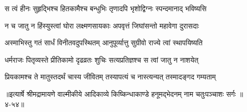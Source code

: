 \twolineshloka
{स त्वं हीनः सुहृद्भिश्च हितकामैश्च बन्धुभिः}
{तृणादपि भृशोद्विग्नः स्पन्दमानाद् भविष्यसि} %

\twolineshloka
{न च जातु न हिंस्युस्त्वां घोरा लक्ष्मणसायकाः}
{अपवृत्तं जिघांसन्तो महावेगा दुरासदाः} %

\twolineshloka
{अस्माभिस्तु गतं सार्धं विनीतवदुपस्थितम्}
{आनुपूर्व्यात्तु सुग्रीवो राज्ये त्वां स्थापयिष्यति} %

\twolineshloka
{धर्मराजः पितृव्यस्ते प्रीतिकामो दृढव्रतः}
{शुचिः सत्यप्रतिज्ञश्च स त्वां जातु न नाशयेत्} %

\twolineshloka
{प्रियकामश्च ते मातुस्तदर्थं चास्य जीवितम्}
{तस्यापत्यं च नास्त्यन्यत् तस्मादङ्गद गम्यताम्} %


॥इत्यार्षे श्रीमद्रामायणे वाल्मीकीये आदिकाव्ये किष्किन्धाकाण्डे हनूमद्भेदनम् नाम चतुःपञ्चाशः सर्गः ॥४-५४॥
